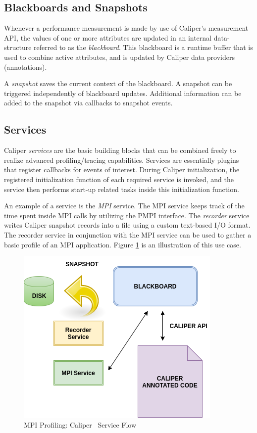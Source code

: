 \subsection{Blackboards and Snapshots}
Whenever a performance measurement is made by use of Caliper's measurement API, the values of one or more attributes are updated in an internal data-structure referred to as the \textit{blackboard}. This blackboard is a runtime buffer that is used to combine active attributes, and is updated by Caliper data providers (annotations).
\par A \textit{snapshot} saves the current context of the blackboard. A snapshot can be triggered independently of blackboard updates. Additional information can be added to the snapshot via callbacks to snapshot events. 
\subsection{Services}
Caliper \emph{services} are the basic building blocks that can be combined freely to realize advanced profiling/tracing capabilities. Services are essentially plugins that register callbacks for events of interest. During Caliper initialization, the registered initialization function of each required service is invoked, and the service then performs start-up related tasks inside this initialization function. 
\par An example of a service is the \textit{MPI} service. The MPI service keeps track of the time spent inside MPI calls by utilizing the PMPI interface. The \textit{recorder} service writes Caliper snapshot records into a file using a custom text-based I/O format. The recorder service in conjunction with the MPI service can be used to gather a basic profile of an MPI application. Figure \ref{fig:caliservices} is an illustration of this use case. 
\begin{center}
	\begin{figure}[bp!]
         \centering
		\includegraphics[scale=0.7, keepaspectratio]{figures/cali-services}
		\caption{MPI Profiling: Caliper~\cite{CALIPER} Service Flow}
		\label{fig:caliservices}
	\end{figure}
\end{center}


